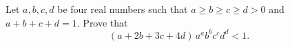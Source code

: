 Let $a, b, c, d$ be four real numbers such that $a \geqslant b \geqslant c \geqslant d > 0$ and $a + b + c + d = 1$. Prove that
\[
(a + 2b + 3c + 4d)\, a^a b^b c^c d^d < 1.
\]

